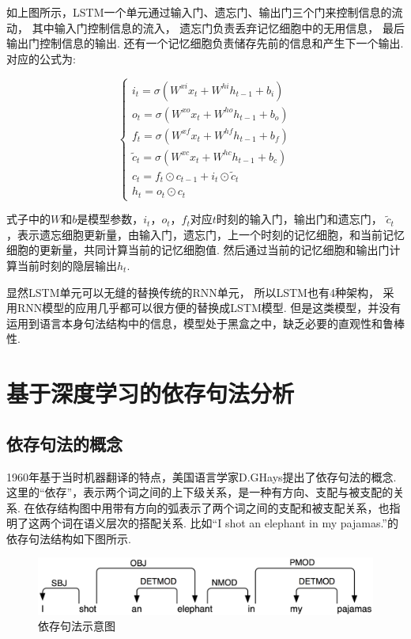 \documentclass[bachelor,adobefonts]{jnuthesis}
\begin{document}
如上图所示，LSTM一个单元通过输入门、遗忘门、输出门三个门来控制信息的流动，
其中输入门控制信息的流入，
遗忘门负责丢弃记忆细胞中的无用信息，
最后输出门控制信息的输出.
还有一个记忆细胞负责储存先前的信息和产生下一个输出.
对应的公式为:

\begin{equation}
  \left\{
  \begin{array}{l}
   i_{t} = \sigma(W^{xi}x_{t}+W^{hi}h_{t-1}+b_{i}) \\ 
   o_{t} = \sigma(W^{xo}x_{t}+W^{ho}h_{t-1}+b_{o}) \\ 
   f_{t} = \sigma(W^{xf}x_{t}+W^{hf}h_{t-1}+b_{f}) \\ 
   \widetilde{c}_{t} = \sigma(W^{xc}x_{t}+W^{hc}h_{t-1}+b_{c}) \\
   c_{t} = f_{t} \odot c_{t-1} + i_{t} \odot \widetilde{c}_{t} \\
   h_{t} = o_{t} \odot c_{t}
  \end{array}
  \right.
\end{equation}

式子中的$W$和$b$是模型参数，$i_{t}$，$o_{t}$，$f_{t}$对应$t$时刻的输入门，输出门和遗忘门，
$\widetilde{c}_{t}$，表示遗忘细胞更新量，由输入门，遗忘门，上一个时刻的记忆细胞，和当前记忆细胞的更新量，共同计算当前的记忆细胞值.
然后通过当前的记忆细胞和输出门计算当前时刻的隐层输出$h_{t}$.

显然LSTM单元可以无缝的替换传统的RNN单元，
所以LSTM也有4种架构，
采用RNN模型的应用几乎都可以很方便的替换成LSTM模型.
但是这类模型，并没有运用到语言本身句法结构中的信息，模型处于黑盒之中，缺乏必要的直观性和鲁棒性.

\section{基于深度学习的依存句法分析}
\subsection{依存句法的概念}
1960年基于当时机器翻译的特点，美国语言学家D.GHays提出了依存句法的概念\cite{Hays1960Grouping}.
这里的“依存”，表示两个词之间的上下级关系，是一种有方向、支配与被支配的关系.
在依存结构图中用带有方向的弧表示了两个词之间的支配和被支配关系，也指明了这两个词在语义层次的搭配关系.
比如“I shot an elephant in my pajamas.”的依存句法结构如下图所示.

\begin{figure}[h!]
  \centering
  \includegraphics[width=0.7\linewidth]{依存句法.png}
  \caption{依存句法示意图}
\end{figure}
\end{document}
